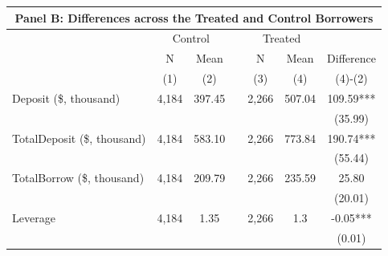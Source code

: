 \begin{table}[ht!]
\begin{tabular*}{\linewidth}{@{\extracolsep{\fill}}lcccccc }
    \midrule
        \multicolumn{7}{c}{Panel B: Differences across the Treated and Control Borrowers} \\
\midrule
          & \multicolumn{2}{c}{Control} &       & \multicolumn{2}{c}{Treated} &  \\
\cmidrule{2-3}\cmidrule{5-6}          & N & Mean &       & N & Mean & Difference \\
\cmidrule{2-3}\cmidrule{5-6}          & (1) & (2) &       & (3) & (4) & (4)-(2) \\
\cmidrule{2-7}    Deposit (\$, thousand) & 4,184 & 397.45 &       & 2,266 & 507.04 & 109.59*** \\
          &       &       &       &       &       & (35.99) \\
    TotalDeposit (\$, thousand) & 4,184 & 583.10 &       & 2,266 & 773.84 & 190.74*** \\
          &       &       &       &       &       & (55.44) \\
    TotalBorrow (\$, thousand) & 4,184 & 209.79 &       & 2,266 & 235.59 & 25.80 \\
          &       &       &       &       &       & (20.01) \\
    Leverage & 4,184 & 1.35  &       & 2,266 & 1.3   & -0.05*** \\
          &       &       &       &       &       & (0.01) \\
    \bottomrule
          \end{tabular*} 



\end{table}%





